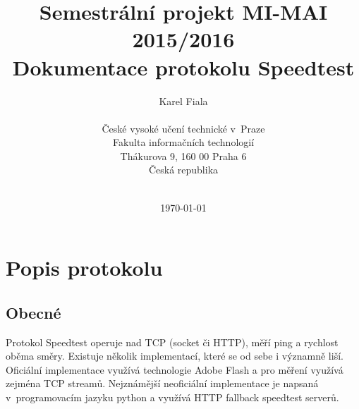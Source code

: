 \documentclass[12pt,a4paper]{article}
\begin{document}
\title{Semestrální projekt MI-MAI\\ 2015/2016\\
Dokumentace protokolu Speedtest \\
\vspace{10px}}
\author{Karel Fiala \\
\vspace{10px} \\
\small České vysoké učení technické v~Praze\\
\small Fakulta informačních technologií\\
\small Thákurova 9, 160 00 Praha 6\\
\small Česká republika \\
\vspace{10px} \\
}
\date{\today}
\maketitle
\thispagestyle{empty}


\clearpage
\thispagestyle{empty}
\tableofcontents
\clearpage

%




\section{Popis protokolu}

\subsection{Obecné}

Protokol Speedtest operuje nad TCP (socket či HTTP), měří ping a rychlost oběma směry. Existuje několik implementací, které se od sebe i významně liší. Oficiální implementace využívá technologie Adobe Flash a pro měření využívá zejména TCP streamů. Nejznámější neoficiální implementace je napsaná v~programovacím jazyku python a využívá HTTP fallback speedtest serverů. 
\end{document}
